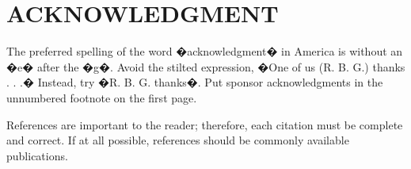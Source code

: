 \documentclass[letterpaper, 10 pt, conference]{ieeeconf}  %
\begin{document}
\section*{ACKNOWLEDGMENT}

The preferred spelling of the word �acknowledgment� in America is without an �e� after the �g�. Avoid the stilted expression, �One of us (R. B. G.) thanks . . .�  Instead, try �R. B. G. thanks�. Put sponsor acknowledgments in the unnumbered footnote on the first page.




References are important to the reader; therefore, each citation must be complete and correct. If at all possible, references should be commonly available publications.
\end{document}
